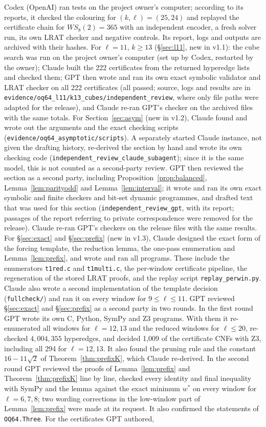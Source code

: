 \documentclass[11pt]{amsart}
\theoremstyle{definition}
\begin{document}
Codex (OpenAI) ran tests on the project owner's computer; according to its reports, it checked the colouring for $(k,\ell)=(25,24)$ and replayed the certificate chain for $WS_8(2)=365$ with an independent encoder, a fresh solver run, its own LRAT checker and negative controls. Its report, logs and outputs are archived with their hashes. For $\ell=11$, $k\ge13$ (\S\ref{sec:l11}, new in v1.1): the cube search was run on the project owner's computer (set up by Codex, restarted by the owner); Claude built the 222 certificates from the returned hyperedge lists and checked them; GPT then wrote and ran its own exact symbolic validator and LRAT checker on all 222 certificates (all passed; source, logs and results are in \texttt{evidence/oq64\_l11/k13\_cubes/independent\_review}, where only file paths were adapted for the release), and Claude re-ran GPT's checker on the archived files with the same totals. For Section~\ref{sec:asym} (new in v1.2), Claude found and wrote out the arguments and the exact checking scripts (\texttt{evidence/oq64\_asymptotic/scripts}). A separately started Claude instance, not given the drafting history, re-derived the section by hand and wrote its own checking code (\texttt{independent\_review\_claude\_subagent}); since it is the same model, this is not counted as a second-party review. GPT then reviewed the section as a second party, including Proposition~\ref{prop:balanced}, Lemma~\ref{lem:parityodd} and Lemma~\ref{lem:interval}; it wrote and ran its own exact symbolic and finite checkers and bit-set dynamic programmes, and drafted text that was used for this section (\texttt{independent\_review\_gpt}, with its report; passages of the report referring to private correspondence were removed for the release). Claude re-ran GPT's checkers on the release files with the same results. For \S\ref{sec:exact} and \S\ref{sec:prefix} (new in v1.3), Claude designed the exact form of the forcing template, the reduction lemma, the one-pass enumeration and Lemma~\ref{lem:prefix}, and wrote and ran all programs. These include the enumerators \texttt{t1red.c} and \texttt{t1multi.c}, the per-window certificate pipeline, the regeneration of the stored LRAT proofs, and the replay script \texttt{replay\_perwin.py}. Claude also wrote a second implementation of the template decision (\texttt{fullcheck/}) and ran it on every window for $9\le\ell\le11$. GPT reviewed \S\ref{sec:exact} and \S\ref{sec:prefix} as a second party in two rounds. In the first round GPT wrote its own C, Python, SymPy and Z3 programs. With them it re-enumerated all windows for $\ell=12,13$ and the reduced windows for $\ell\le20$, re-checked $4{,}004{,}355$ hyperedges, and decided 1{,}009 of the certificate CNFs with Z3, including all 294 for $\ell=12,13$. It also found the pruning rule and the constant $16-11\sqrt2$ of Theorem~\ref{thm:prefixK}, which Claude re-derived. In the second round GPT reviewed the proofs of Lemma~\ref{lem:prefix} and Theorem~\ref{thm:prefixK} line by line, checked every identity and final inequality with SymPy and the lemma against the exact minimum $w^*$ on every window for $\ell=6,7,8$; two wording corrections in the low-window part of Lemma~\ref{lem:prefix} were made at its request. It also confirmed the statements of \texttt{OQ64.Three}. For the certificates GPT authored, 
\end{document}
